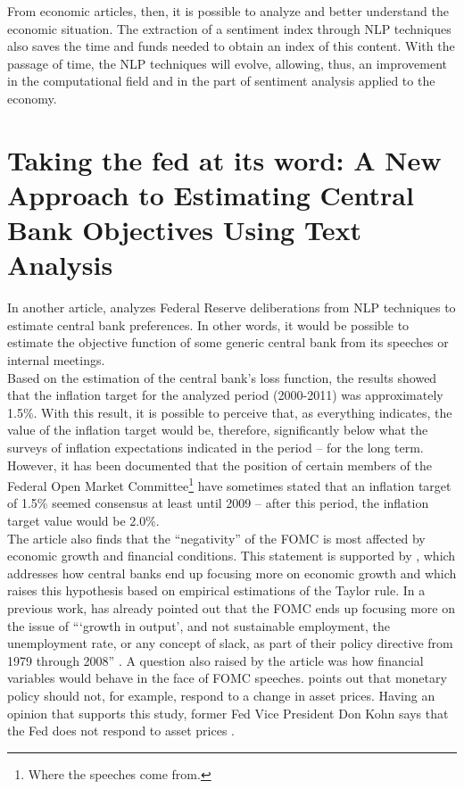 From economic articles, then, it is possible to analyze and better understand the economic situation. The extraction of a sentiment index through NLP techniques also saves the time and funds needed to obtain an index of this content. With the passage of time, the NLP techniques will evolve, allowing, thus, an improvement in the computational field and in the part of sentiment analysis applied to the economy.\\

\section{Taking the fed at its word: A New Approach to Estimating Central Bank Objectives Using Text Analysis}

In another article, \cite{shapiro2021taking} analyzes Federal Reserve deliberations from NLP techniques to estimate central bank preferences. In other words, it would be possible to estimate the objective function of some generic central bank from its speeches or internal meetings.\\

Based on the estimation of the central bank's loss function, the results showed that the inflation target for the analyzed period (2000-2011) was approximately 1.5\%. With this result, it is possible to perceive that, as everything indicates, the value of the inflation target would be, therefore, significantly below what the surveys of inflation expectations indicated in the period -- for the long term. However, it has been documented \cite[p.32]{shapiro2021taking} that the position of certain members of the Federal Open Market Committee\footnote{Where the speeches come from.} have sometimes stated that an inflation target of 1.5\% seemed consensus at least until 2009 -- after this period, the inflation target value would be 2.0\%.\\

The article also finds that the ``negativity'' of the FOMC is most affected by economic growth and financial conditions. This statement is supported by \cite{walsh2003speed}, which addresses how central banks end up focusing more on economic growth and \cite{coibion2011monetary} which raises this hypothesis based on empirical estimations of the Taylor rule. In a previous work, \cite{thornton2011does} has already pointed out that the FOMC ends up focusing more on the issue of ```growth in output', and not sustainable employment, the unemployment rate, or any concept of slack, as part of their policy directive from 1979 through 2008'' \cite[p.34]{shapiro2021taking}. A question also raised by the article was how financial variables would behave in the face of FOMC speeches. \cite{bernanke2001should} points out that monetary policy should not, for example, respond to a change in asset prices. Having an opinion that supports this study, former Fed Vice President Don Kohn says that the Fed does not respond to asset prices \cite{kohn2006monetary, kohn2009monetary}.\\

